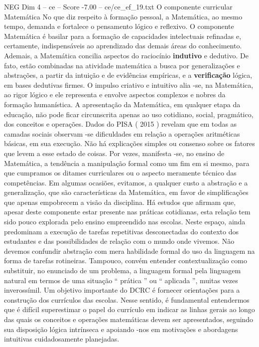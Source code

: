 \begin{textsample}{NEG Dim 4 – ce – Score -7.00 – ce/ce\_ef\_19.txt}  \label{ex:f4_neg_151}
O componente curricular Matemática No que diz respeito à formação pessoal, a Matemática, ao mesmo tempo, demanda e fortalece o pensamento lógico e reflexivo.
O componente Matemática é basilar para a formação de capacidades intelectuais refinadas e, certamente, indispensáveis ao aprendizado das demais áreas do conhecimento.
Ademais, a Matemática concilia aspectos do raciocínio \textbf{indutivo} e dedutivo.
De fato, estão combinadas na atividade matemática a busca por generalizações e abstrações, a partir da intuição e de evidências empíricas, e a \textbf{verificação} lógica, em bases dedutivas firmes.
O impulso criativo e intuitivo alia -se, na Matemática, ao rigor lógico e ele representa e envolve aspectos complexos e nobres da formação humanística.
A apresentação da Matemática, em qualquer etapa da educação, não pode ficar circunscrita apenas ao uso cotidiano, social, pragmático, dos conceitos e operações.
Dados do PISA ( 2015 ) revelam que em todas as camadas sociais observam -se dificuldades em relação a operações aritméticas básicas, em sua execução.
Não há explicações simples ou consenso sobre os fatores que levem a esse estado de coisas.
Por vezes, manifesta -se, no ensino de Matemática, a tendência a manipulação formal como um fim em si mesmo, para que cumpramos os ditames curriculares ou o aspecto meramente técnico das competências.
Em algumas ocasiões, evitamos, a qualquer custo a abstração e a generalização, que são características da Matemática, em favor de simplificações que apenas empobrecem a visão da disciplina.
Há estudos que afirmam que, apesar deste componente estar presente nas práticas cotidianas, esta relação tem sido pouco explorada pelo ensino empreendido nas escolas.
Neste espaço, ainda predominam a execução de tarefas repetitivas desconectadas do contexto dos estudantes e das possibilidades de relação com o mundo onde vivemos.
Não devemos confundir abstração com mera habilidade formal do uso da linguagem na forma de tarefas rotineiras.
Tampouco, convém entender contextualização como substituir, no enunciado de um problema, a linguagem formal pela linguagem natural em termos de uma situação “ prática ” ou “ aplicada ”, muitas vezes inverossímil.
Um objetivo importante do DCRC é fornecer orientações para a construção dos currículos das escolas.
Nesse sentido, é fundamental entendermos que é difícil superestimar o papel do currículo em indicar as linhas gerais ao longo das quais os conceitos e operações matemáticas devem ser apresentados, seguindo sua disposição lógica intrínseca e apoiando -nos em motivações e abordagens intuitivas cuidadosamente planejadas.

\end{textsample}
